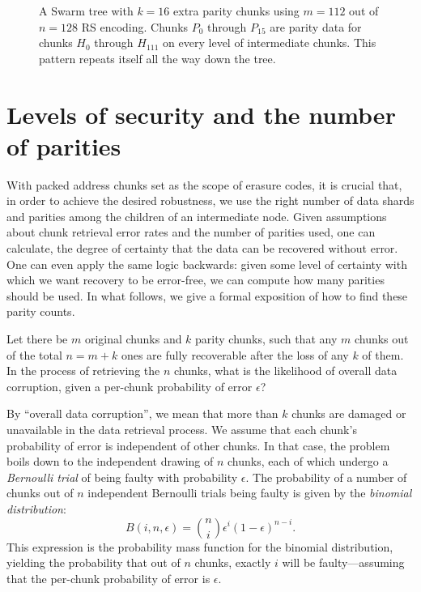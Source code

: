 \documentclass[manuscript,screen,review]{acmart}
\begin{document}
\begin{figure}[!ht]
   \centering
   \resizebox{1\textwidth}{!}{
        
   }
   \caption[Swarm hash erasure]{A Swarm tree with $k=16$ extra parity chunks using $m=112$ out of $n=128$ RS encoding. Chunks $P_{0}$ through $P_{15}$ are parity data for chunks $H_0 $ through $H_{111}$ on every level of intermediate chunks. This pattern repeats itself all the way down the tree. }
   \label{fig:Swarm-hash-erasure}
\end{figure}



\section{Levels of security and the number of parities}\label{sec:levels}

With packed address chunks set as the scope of erasure codes, it is crucial that, in order to achieve the desired robustness, we use the right number of data shards and parities among the children of an intermediate node.
Given assumptions about chunk retrieval error rates and the number of parities used, one can calculate, the degree of certainty that the data can be recovered without error. One can even apply the same logic backwards: given some level of certainty with which we want recovery to be error-free, we can compute how many parities should be used.
In what follows, we give a formal exposition of how to find these parity counts.


Let there be $m$ original chunks and $k$ parity chunks, such that any $m$ chunks out of the total $n = m + k$ ones are fully recoverable after the loss of any $k$ of them. In the process of retrieving the $n$ chunks, what is the likelihood of overall data corruption, given a per-chunk probability of error $\epsilon$?

By ``overall data corruption'', we mean that more than $k$ chunks are damaged or unavailable in the data retrieval process. We assume that each chunk's probability of error is independent of other chunks. In that case, the problem boils down to the independent drawing of $n$ chunks, each of which undergo a \emph{Bernoulli trial} of being faulty with probability $\epsilon$. The probability of a number of chunks out of $n$ independent Bernoulli trials being faulty is given by the \emph{binomial distribution}:
\begin{equation}
  B(i, n, \epsilon) = \binom{n}{i} \epsilon^i (1-\epsilon)^{n-i} .
  \label{eq-PMF-binomial}
\end{equation}
This expression is the probability mass function for the binomial distribution, yielding the probability that out of $n$ chunks, exactly $i$ will be faulty---assuming that the per-chunk probability of error is $\epsilon$.
\end{document}
